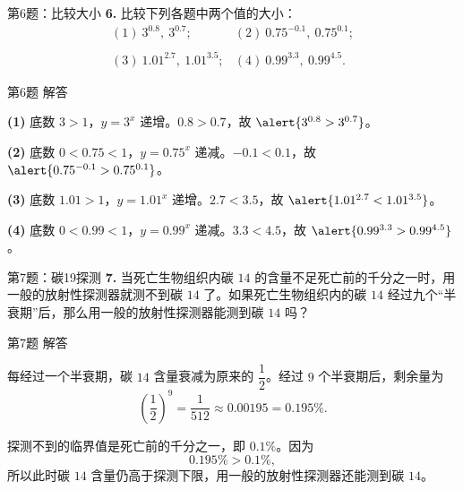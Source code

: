 \documentclass[10pt,aspectratio=169,serif,fleqn]{ctexbeamer}
\begin{document}
\begin{frame}[t]{第6题：比较大小}
\textbf{6.} 比较下列各题中两个值的大小：
\[
\begin{array}{ll}
(1)\ 3^{0.8},\ 3^{0.7};&
(2)\ 0.75^{-0.1},\ 0.75^{0.1};\\
 & \\
(3)\ 1.01^{2.7},\ 1.01^{3.5};&
(4)\ 0.99^{3.3},\ 0.99^{4.5}.
\end{array}
\]
\end{frame}

\begin{frame}[t]{第6题 解答}
\begin{tcolorbox}[colback=xyyg_orange!5,colframe=xyyg_orange,title=\textbf{解}]
\textbf{(1)} 底数 $3>1$，$y=3^{x}$ 递增。$0.8>0.7$，故 $\alert{3^{0.8}>3^{0.7}}$。

\vspace{0.4em}
\textbf{(2)} 底数 $0<0.75<1$，$y=0.75^{x}$ 递减。$-0.1<0.1$，故 $\alert{0.75^{-0.1}>0.75^{0.1}}$。

\vspace{0.4em}
\textbf{(3)} 底数 $1.01>1$，$y=1.01^{x}$ 递增。$2.7<3.5$，故 $\alert{1.01^{2.7}<1.01^{3.5}}$。

\vspace{0.4em}
\textbf{(4)} 底数 $0<0.99<1$，$y=0.99^{x}$ 递减。$3.3<4.5$，故 $\alert{0.99^{3.3}>0.99^{4.5}}$。
\end{tcolorbox}
\end{frame}

\begin{frame}[t]{第7题：碳19探测}
\textbf{7.} 当死亡生物组织内碳 $14$ 的含量不足死亡前的千分之一时，用一般的放射性探测器就测不到碳 $14$ 了。如果死亡生物组织内的碳 $14$ 经过九个“半衰期”后，那么用一般的放射性探测器能测到碳 $14$ 吗？
\end{frame}

\begin{frame}[t]{第7题 解答}
\begin{tcolorbox}[colback=xyyg_orange!5,colframe=xyyg_orange,title=\textbf{解}]
每经过一个半衰期，碳 $14$ 含量衰减为原来的 $\dfrac{1}{2}$。经过 $9$ 个半衰期后，剩余量为
\[
\left(\frac{1}{2}\right)^{9}=\frac{1}{512}\approx 0.00195=0.195\%.
\]

\vspace{0.5em}
探测不到的临界值是死亡前的千分之一，即 $0.1\%$。因为
\[
0.195\% > 0.1\%,
\]
所以此时碳 $14$ 含量\alert{仍高于}探测下限，用一般的放射性探测器\alert{还能测到}碳 $14$。
\end{tcolorbox}
\end{frame}
\end{document}
